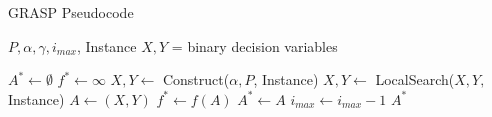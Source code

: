 \documentclass{beamer}
\begin{document}
\begin{frame}{GRASP Pseudocode}
        \begin{algorithmic}[1]
        
        \REQUIRE $P, \alpha, \gamma, i_{max}$, Instance
        \ENSURE $X,Y$ = binary decision variables
        
        \STATE $A^* \gets \emptyset$
        \STATE $f^* \gets \infty$
            \STATE $X, Y \gets$ Construct($\alpha, P$, Instance)
            \STATE $X, Y \gets$ LocalSearch($X, Y,$ Instance)
            \STATE $A \gets (X, Y)$
                \STATE $f^* \gets f(A)$
                \STATE $A^* \gets A$ 
            \ENDIF
            \STATE $i_{max} \gets i_{max} - 1$
        \ENDWHILE
        \RETURN $A^*$
        \end{algorithmic}
\end{frame}
\end{document}
